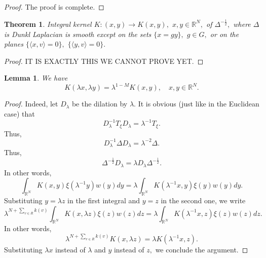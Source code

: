 \documentclass{amsart}
\newtheorem{thm}{Theorem}
\newtheorem{lem}{Lemma}
\begin{document}
\begin{proof}
	The proof is complete.
\end{proof}



\begin{thm}\label{kernel smoothness} Integral kernel $K:(x,y)\to K(x,y),$ $x,y\in\mathbb{R}^N,$ of $\Delta^{-\frac12},$ where $\Delta$ is Dunkl Laplacian is smooth except on the sets
$\{x=gy\},$ $g\in G,$ or on the planes $\{\langle x,v\rangle=0\},$ $\{\langle y,v\rangle=0\}.$ 
\end{thm}
\begin{proof} {\color{red} IT IS EXACTLY THIS WE CANNOT PROVE YET.}
\end{proof}

\begin{lem} We have
$$K(\lambda x,\lambda y)=\lambda^{1-M}K(x,y),\quad x,y\in\mathbb{R}^N.$$
\end{lem}
\begin{proof} Indeed, let $D_{\lambda}$ be the dilation by $\lambda.$ It is obvious (just like in the Euclidean case) that
$$D_{\lambda}^{-1}T_{\xi}D_{\lambda}=\lambda^{-1}T_{\xi}.$$
Thus,
$$D_{\lambda}^{-1}\Delta D_{\lambda}=\lambda^{-2}\Delta.$$
Thus,
$$\Delta^{-\frac12}D_{\lambda}=\lambda D_{\lambda}\Delta^{-\frac12}.$$
In other words,
$$\int_{\mathbb{R}^N}K(x,y)\xi(\lambda^{-1}y)w(y)dy=\lambda \int_{\mathbb{R}^N}K(\lambda^{-1}x,y)\xi(y)w(y)dy.$$
Substituting $y=\lambda z$ in the first integral and $y=z$ in the second one, we write
$$\lambda^{N+\sum_{v\in R}k(v)}\int_{\mathbb{R}^N}K(x,\lambda z)\xi(z)w(z)dz=\lambda \int_{\mathbb{R}^N}K(\lambda^{-1}x,z)\xi(z)w(z)dz.$$
In other words,
$$\lambda^{N+\sum_{v\in R}k(v)}K(x,\lambda z)=\lambda K(\lambda^{-1}x,z).$$
Substituting $\lambda x$ instead of $\lambda$ and $y$ instead of $z,$ we conclude the argument.
\end{proof}
\end{document}
